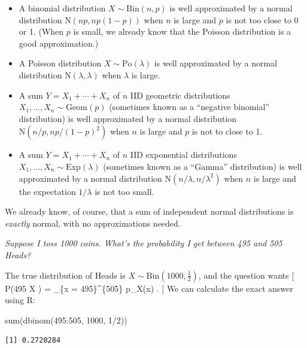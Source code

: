 \documentclass[
  letterpaper,
]{report}
\newenvironment{Shaded}{\begin{snugshade}}{\end{snugshade}}
\newcommand{\DecValTok}[1]{\textcolor[rgb]{0.68,0.00,0.00}{#1}}
\newcommand{\FunctionTok}[1]{\textcolor[rgb]{0.28,0.35,0.67}{#1}}
\newcommand{\NormalTok}[1]{\textcolor[rgb]{0.00,0.23,0.31}{#1}}
\newcommand{\SpecialCharTok}[1]{\textcolor[rgb]{0.37,0.37,0.37}{#1}}
\providecommand{\tightlist}{%
  \setlength{\itemsep}{0pt}\setlength{\parskip}{0pt}}\usepackage{longtable,booktabs,array}
\theoremstyle{definition}
\theoremstyle{definition}
\theoremstyle{remark}
\begin{document}
\begin{itemize}
\tightlist
\item
  A binomial distribution \(X \sim \mathrm{Bin}(n, p)\) is well
  approximated by a normal distribution \(\mathrm{N}(np, np(1-p))\) when
  \(n\) is large and \(p\) is not too close to 0 or 1. (When \(p\) is
  small, we already know that the Poisson distribution is a good
  approximation.)
\item
  A Poisson distribution \(X \sim \mathrm{Po}(\lambda)\) is well
  approximated by a normal distribution \(\mathrm{N}(\lambda, \lambda)\)
  when \(\lambda\) is large.
\item
  A sum \(Y = X_1 + \cdots + X_n\) of \(n\) IID geometric distributions
  \(X_1, \dots, X_n \sim \mathrm{Geom}(p)\) (sometimes known as a
  ``negative binomial'' distribution) is well approximated by a normal
  distribution \(\mathrm{N}(n/p, np/(1-p)^2)\) when \(n\) is large and
  \(p\) is not to close to 1.
\item
  A sum \(Y = X_1 + \cdots + X_n\) of \(n\) IID exponential
  distributions \(X_1, \dots, X_n \sim \mathrm{Exp}(\lambda)\)
  (sometimes known as a ``Gamma'' distribution) is well approximated by
  a normal distribution \(\mathrm{N}(n/\lambda, n/\lambda^2)\) when
  \(n\) is large and the expectation \(1/\lambda\) is not too small.
\end{itemize}

We already know, of course, that a sum of independent normal
distributions is \emph{exactly} normal, with no approximations needed.

\emph{Suppose I toss 1000 coins. What's the probability I get between
495 and 505 Heads?}

The true distribution of Heads is
\(X \sim \mathrm{Bin}(1000, \frac12)\), and the question wants {[}
\mathbb P(495 \leq X ) = \sum\_\{x = 495\}\^{}\{505\} p\_X(x) .
{]} We can calculate the exact answer using R:

\begin{Shaded}
\begin{Highlighting}[]
\FunctionTok{sum}\NormalTok{(}\FunctionTok{dbinom}\NormalTok{(}\DecValTok{495}\SpecialCharTok{:}\DecValTok{505}\NormalTok{, }\DecValTok{1000}\NormalTok{, }\DecValTok{1}\SpecialCharTok{/}\DecValTok{2}\NormalTok{))}
\end{Highlighting}
\end{Shaded}

\begin{verbatim}
[1] 0.2720284
\end{verbatim}
\end{document}
